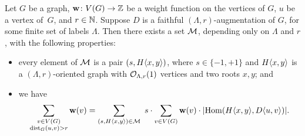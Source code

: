 \begin{lemma}\label{lem:IE}
	Let $G$ be a graph, $\mathbf{w}\colon V(G)\to \mathbb{Z}$ be a weight function on the vertices of $G$, $u$ be a vertex of~$G$, and $r\in \mathbb{N}$. Suppose $D$ is a faithful $(\Lambda,r)$-augmentation of $G$, for some finite set of labels $\Lambda$. Then there exists a set $\mathcal{M}$, depending only on $\Lambda$ and $r$, with the following properties:
	\begin{itemize}
		\item every element of $\mathcal{M}$ is a pair $(s, H\langle x,y\rangle)$, where $s\in \{-1,+1\}$ and $H\langle x,y\rangle$ is a $(\Lambda,r)$-oriented graph with $\mathcal{O}_{\Lambda,r}(1)$ vertices and two roots $x,y$; and
		\item we have
		\[\sum_{\substack{v\in V(G)\\ \mathrm{dist}_G(u,v)>r}} \mathbf{w}(v) =\sum_{(s,H\langle x,y\rangle)\in \mathcal{M}}\ s\cdot \sum_{v\in V(G)} \mathbf{w}(v)\cdot |\mathrm{Hom}(H\langle x,y\rangle,D\langle u,v\rangle)|.\]
	\end{itemize}
\end{lemma}
